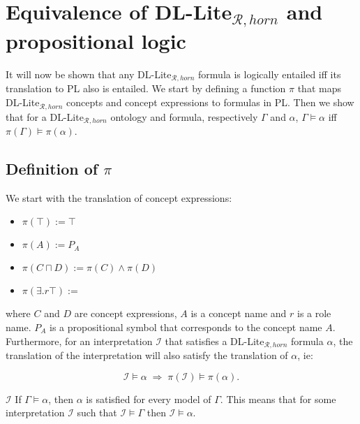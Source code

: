 \chapter{Equivalence of DL-Lite$_{\mathcal{R}, horn}$ and propositional logic}

It will now be shown that any DL-Lite$_{\mathcal{R}, horn}$ formula is logically entailed iff its translation to PL also is entailed. We start by defining a function $\pi$ that maps DL-Lite$_{\mathcal{R}, horn}$ concepts and concept expressions to formulas in PL. Then we show that for a DL-Lite$_{\mathcal{R}, horn}$ ontology and formula, respectively $\Gamma$ and $\alpha$, $\Gamma \models \alpha$ iff $\pi(\Gamma) \models \pi(\alpha)$.

\section{Definition of $\pi$}
We start with the translation of concept expressions:
\begin{itemize}
    \item $\pi(\top) := \top$
    \item $\pi(A) := P_A$
    \item $\pi(C \sqcap D) := \pi(C) \wedge \pi(D)$
    \item $\pi(\exists .r\top) := $
\end{itemize}
 where $C$ and $D$ are concept expressions, $A$ is a concept name and $r$ is a role name. $P_A$ is a propositional symbol that corresponds to the concept name $A$. Furthermore, for an interpretation $\mathcal{I}$ that satisfies a DL-Lite$_{\mathcal{R}, horn}$ formula $\alpha$, the translation of the interpretation will also satisfy the translation of $\alpha$, ie:
 
 \[\mathcal{I} \models \alpha \; \Rightarrow \; \pi (\mathcal{I}) \models \pi(\alpha).\]
 
$\mathcal{I}$
If $\Gamma \models \alpha$, then $\alpha$ is satisfied for every model of $\Gamma$. This means that for some interpretation $\mathcal{I}$ such that $\mathcal{I} \models \Gamma$ then $\mathcal{I} \models \alpha$.
 
 